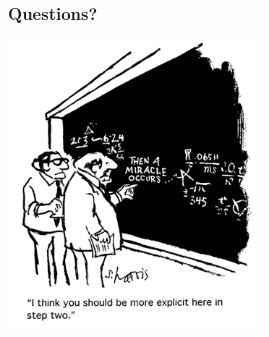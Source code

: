 \documentclass[xcolor=x11names,compress]{beamer}
\renewcommand{\(}{\begin{columns}}
\renewcommand{\)}{\end{columns}}
\newcommand{\<}[1]{\begin{column}{#1}}
\renewcommand{\>}{\end{column}}
\begin{document}
\section*{}
\begin{frame}[fragile]
  \frametitle{Questions?}
  \begin{center}
  \includegraphics[height=3in,clip]{../questions-comic}  
  \end{center}
  
\end{frame}
\end{document}
